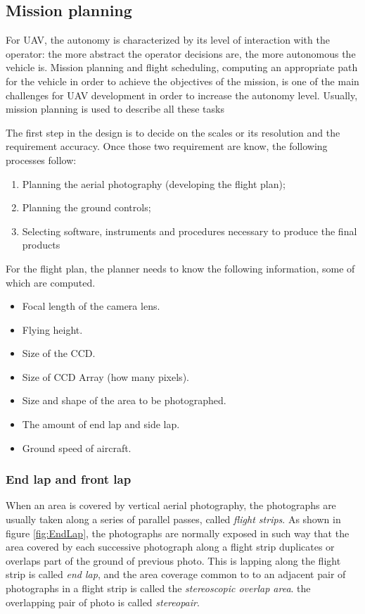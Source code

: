 \subsection{Mission planning} For UAV, the autonomy is characterized by its level of
interaction with the operator: the more abstract the operator decisions are, the more autonomous the vehicle is. Mission planning and flight scheduling, computing an appropriate path for the vehicle in order to achieve the objectives of the mission, is one of the main challenges for UAV development in order to increase the autonomy level. Usually, mission planning is used to describe all these tasks\cite{4281723}

The first step in the design is to decide on the scales or its resolution and the requirement accuracy. Once those two requirement are know, the following processes follow:
\begin{enumerate}
\item Planning the aerial photography (developing the flight plan);
\item Planning the ground controls;
\item Selecting software, instruments and procedures necessary to produce the final products
\end{enumerate}
For the flight plan, the planner needs to know the following information, some of which are computed.\cite{Design_plann}
\begin{itemize}
\item Focal length of the camera lens.
\item Flying height.
\item Size of the CCD.
\item Size of CCD Array (how many pixels).
\item Size and shape of the area to be photographed.
\item The amount of end lap and side lap.
\item Ground speed of aircraft.
\end{itemize}
\subsubsection{End lap and front lap}
When an area is covered by vertical aerial photography, the photographs are usually taken along a series of parallel passes, called \textit{flight strips}. As shown in figure \ref{fig:EndLap}, the photographs are normally exposed in such way that the area covered by each successive photograph along a flight strip duplicates or overlaps part of the ground of previous photo. This is lapping along the flight strip is called \textit{end lap}, and the area coverage common to to an adjacent pair of photographs in a flight strip is called the \textit{stereoscopic overlap area}. the overlapping pair of photo is called \textit{stereopair}\cite{elements_photogrammetry}.

